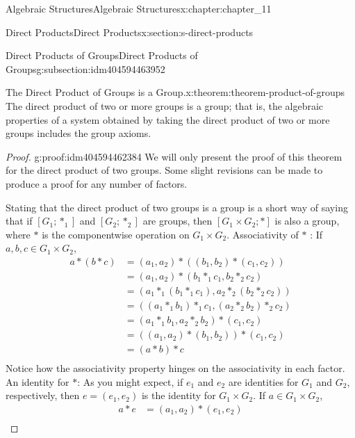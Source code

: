 \documentclass[twoside,10pt,]{book}
\numberwithin{equation}{section}
\begin{document}
\begin{chapterptx}{Algebraic Structures}{}{Algebraic Structures}{}{}{x:chapter:chapter_11}
\begin{sectionptx}{Direct Products}{}{Direct Products}{}{}{x:section:s-direct-products}
%
\begin{subsectionptx}{Direct Products of Groups}{}{Direct Products of Groups}{}{}{g:subsection:idm404594463952}
\begin{theorem}{The Direct Product of Groups is a Group.}{}{x:theorem:theorem-product-of-groups}%
The direct product of two or more groups is a group; that is, the algebraic properties of a system obtained by taking the direct product of two or more groups includes the group axioms.%
\end{theorem}
\begin{proof}{}{g:proof:idm404594462384}
We will only present the proof of this theorem for the direct product of two groups. Some slight revisions can be made to produce a proof for any number of factors.%
\par
Stating that the direct product of two groups is a group is a short way of saying that if \(\left[G_1; *_1\right]\) and \(\left[G_2; *_2\right]\) are groups, then \(\left[G_1\times G_2; * \right]\) is also a group, where \(*\) is the componentwise operation on \(G_1\times G_2\). Associativity of \(*\) : If \(a, b, c \in G_1\times G_2\),%
\begin{equation*}
\begin{split}
a * (b * c) & =\left(a_1,a_2\right)*\left(\left(b_1,b_2\right)*\left(c_1,c_2\right)\right)\\
&  =\left(a_1,a_2\right)*\left(b_1*_1c_1,b_2*_2c_2\right)\\
&  = \left(a_1*_1\left(b_1*_1c_1\right),a_2*_2\left(b_2*_2c_2\right)\right)\\
&  = \left(\left(a_1*_1b_1\right)*_1c_1,\left(a_2*_2b_2\right)*_2c_2\right)\\
&  = \left(a_1*_1b_1,a_2*_2b_2\right)*\left(c_1,c_2\right)\\
&  = \left(\left(a_1,a_2\right)*\left(b_1,b_2\right)\right)*\left(c_1,c_2\right)\\
&  = (a * b)*c\\
\end{split}
\end{equation*}
Notice how the associativity property hinges on the associativity in each factor. An identity for \(*\): As you might expect, if \(e_1\) and \(e_2\) are identities for \(G_1\) and \(G_2\), respectively, then  \(e = \left(e_1, e
_2 \right)\) is the identity for \(G_1 \times G_2\).  If  \(a \in G_1\times G_2\),%
\begin{equation*}
\begin{split}
a * e &=\left(a_1,a_2\right)* \left(e_1, e _2 \right)\\

\end{split}
\end{equation*}
\end{proof}
\end{subsectionptx}
\end{sectionptx}
\end{chapterptx}
\end{document}
